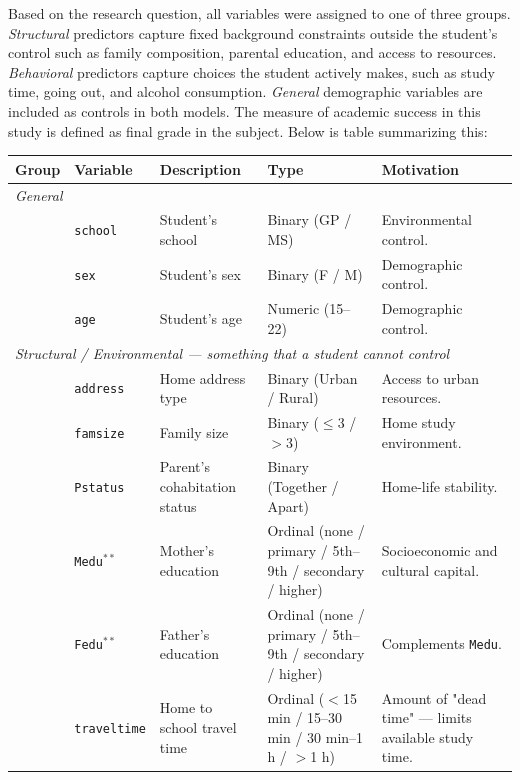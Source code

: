 \documentclass{article}
\begin{document}
Based on the research question, all variables were assigned to one of three groups. \textit{Structural} predictors capture fixed background constraints outside the student's control such as family composition, parental education, and access to resources. \textit{Behavioral} predictors capture choices the student actively makes, such as study time, going out, and alcohol consumption. \textit{General} demographic variables are included as controls in both models. The measure of academic success in this study is defined as final grade in the subject. Below is table summarizing this:


\begin{table}[h!]
\centering
\footnotesize         
\begin{tabularx}{\textwidth}{llXp{4.5cm}X}
\toprule
\textbf{Group} & \textbf{Variable} & \textbf{Description} & \textbf{Type} & \textbf{Motivation} \\
\midrule
\multicolumn{5}{l}{\textit{General}} \\
\midrule
& \texttt{school} & Student's school         & Binary (GP / MS)    & Environmental control. \\
& \texttt{sex}    & Student's sex            & Binary (F / M)      & Demographic control. \\
& \texttt{age}    & Student's age            & Numeric (15--22)    & Demographic control. \\
\midrule
\multicolumn{5}{l}{\textit{Structural / Environmental --- something that a student cannot control}} \\
\midrule
& \texttt{address}      & Home address type            & Binary (Urban / Rural)                                        & Access to urban resources. \\
& \texttt{famsize}      & Family size                  & Binary ($\leq$3 / $>$3)                                       & Home study environment. \\
& \texttt{Pstatus}      & Parent's cohabitation status & Binary (Together / Apart)                                     & Home-life stability. \\
& \texttt{Medu}$^{**}$  & Mother's education           & Ordinal (none / primary / 5th--9th / secondary / higher)      & Socioeconomic and cultural capital. \\
& \texttt{Fedu}$^{**}$  & Father's education           & Ordinal (none / primary / 5th--9th / secondary / higher)      & Complements \texttt{Medu}. \\
& \texttt{traveltime}   & Home to school travel time   & Ordinal ($<$15 min / 15--30 min / 30 min--1 h / $>$1 h)       & Amount of "dead time" --- limits available study time. \\

\end{tabularx}
\end{table}
\end{document}
